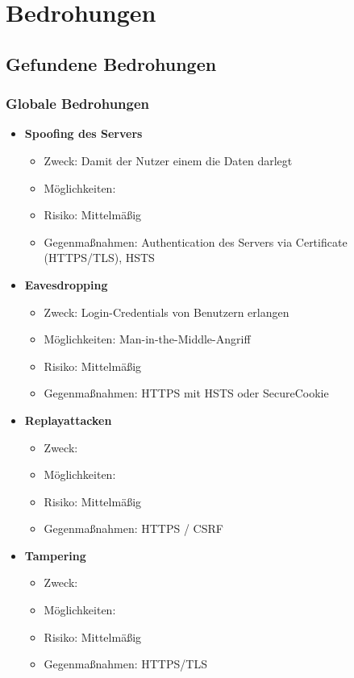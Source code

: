 \documentclass[12pt,DIV14,BCOR10mm,a4paper,twoside,parskip=half-,headsepline,headinclude,english,ngerman,bibliography=totocnumbered]{scrreprt}
\begin{document}
\chapter{Bedrohungen}
\section{Gefundene Bedrohungen}

\subsection{Globale Bedrohungen}

\begin{itemize}
  \item \textbf{Spoofing des Servers}
  \begin{itemize}
  \item Zweck: Damit der Nutzer einem die Daten darlegt
  \item Möglichkeiten:
  \item Risiko: Mittelmäßig
  \item Gegenmaßnahmen: Authentication des Servers via Certificate (HTTPS/TLS), HSTS
  \end{itemize}

  \item \textbf{Eavesdropping}
  \begin{itemize}
  \item Zweck: Login-Credentials von Benutzern erlangen
  \item Möglichkeiten: Man-in-the-Middle-Angriff
  \item Risiko: Mittelmäßig
  \item Gegenmaßnahmen: HTTPS mit HSTS oder SecureCookie
  \end{itemize}

  \item \textbf{Replayattacken}
  \begin{itemize}
  \item Zweck:
  \item Möglichkeiten:
  \item Risiko: Mittelmäßig
  \item Gegenmaßnahmen: HTTPS / CSRF
  \end{itemize}

  \item \textbf{Tampering}
  \begin{itemize}
  \item Zweck:
  \item Möglichkeiten:
  \item Risiko: Mittelmäßig
  \item Gegenmaßnahmen: HTTPS/TLS
  \end{itemize}


\end{itemize}
\end{document}

